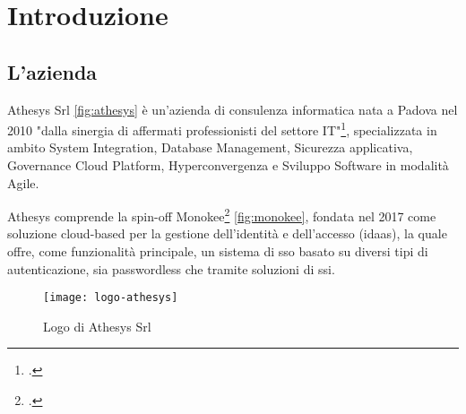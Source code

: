 
\chapter{Introduzione}
\label{cap:introduzione}







\section{L'azienda}

Athesys Srl \autoref{fig:athesys} è un'azienda di consulenza informatica nata a Padova nel 2010 "dalla sinergia di affermati professionisti del settore IT"\footcite{site:athesys}, specializzata in ambito System Integration, Database Management, Sicurezza applicativa, Governance Cloud Platform, Hyperconvergenza e
Sviluppo Software in modalità Agile.

Athesys comprende la spin-off Monokee\footcite{site:monokee} \autoref{fig:monokee}, fondata nel 2017 come soluzione cloud-based per la gestione dell'identità
e dell'accesso (\acrfull{idaas}), la quale offre, come funzionalità principale, un sistema di \acrshort{sso} basato 
su diversi tipi di autenticazione, sia passwordless che tramite soluzioni di \acrfull{ssi}.

\vspace{20pt}
\begin{figure}[!h] 
    \centering 
    \texttt{[image: logo-athesys]} 
    \caption{Logo di Athesys Srl}
    \label{fig:athesys}
\end{figure}

